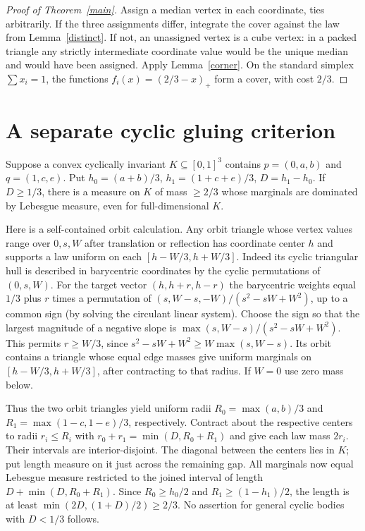 \documentclass[11pt]{article}
\begin{document}
\begin{proof}[Proof of Theorem~\ref{main}] Assign a median vertex in each coordinate, ties arbitrarily. If the three assignments differ, integrate the cover against the law from Lemma~\ref{distinct}. If not, an unassigned vertex is a cube vertex: in a packed triangle any strictly intermediate coordinate value would be the unique median and would have been assigned. Apply Lemma~\ref{corner}. On the standard simplex $\sum x_i=1$, the functions $f_i(x)=(2/3-x)_+$ form a cover, with cost $2/3$.\end{proof}
\section*{A separate cyclic gluing criterion}
Suppose a convex cyclically invariant $K\subseteq[0,1]^3$ contains $p=(0,a,b)$ and $q=(1,c,e)$. Put $h_0=(a+b)/3$, $h_1=(1+c+e)/3$, $D=h_1-h_0$. If $D\ge1/3$, there is a measure on $K$ of mass $\ge2/3$ whose marginals are dominated by Lebesgue measure, even for full-dimensional $K$.

Here is a self-contained orbit calculation. Any orbit triangle whose vertex values range over $0,s,W$ after translation or reflection has coordinate center $h$ and supports a law uniform on each $[h-W/3,h+W/3]$. Indeed its cyclic triangular hull is described in barycentric coordinates by the cyclic permutations of $(0,s,W)$. For the target vector $(h,h+r,h-r)$ the barycentric weights equal $1/3$ plus $r$ times a permutation of $(s,W-s,-W)/(s^2-sW+W^2)$, up to a common sign (by solving the circulant linear system). Choose the sign so that the largest magnitude of a negative slope is $\max(s,W-s)/(s^2-sW+W^2)$. This permits $r\ge W/3$, since $s^2-sW+W^2\ge W\max(s,W-s)$. Its orbit contains a triangle whose equal edge masses give uniform marginals on $[h-W/3,h+W/3]$, after contracting to that radius. If $W=0$ use zero mass below.

Thus the two orbit triangles yield uniform radii $R_0=\max(a,b)/3$ and $R_1=\max(1-c,1-e)/3$, respectively. Contract about the respective centers to radii $r_i\le R_i$ with $r_0+r_1=\min(D,R_0+R_1)$ and give each law mass $2r_i$. Their intervals are interior-disjoint. The diagonal between the centers lies in $K$; put length measure on it just across the remaining gap. All marginals now equal Lebesgue measure restricted to the joined interval of length $D+\min(D,R_0+R_1)$. Since $R_0\ge h_0/2$ and $R_1\ge(1-h_1)/2$, the length is at least $\min(2D,(1+D)/2)\ge2/3$. No assertion for general cyclic bodies with $D<1/3$ follows.
\end{document}

